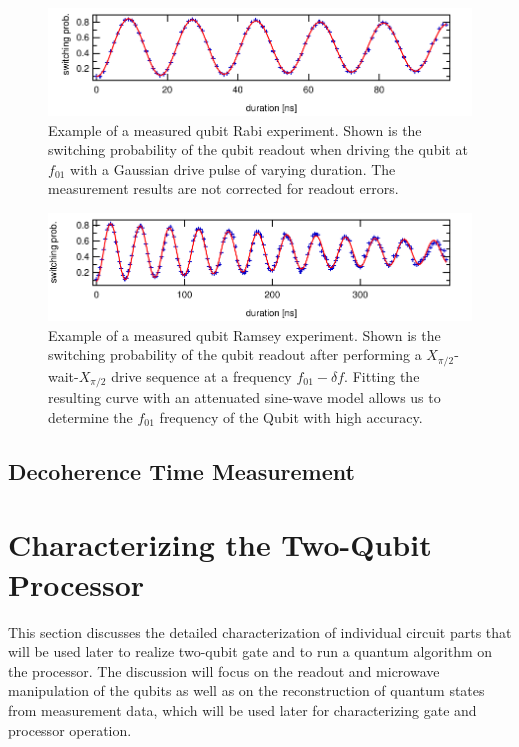 \begin{figure}[ht!]
\centering
\includegraphics[width=1\textwidth]{"./data/ct5/2011_04_21 - grover and tomo/example - qubit 2 rabi"}
\caption[]{Example of a measured qubit Rabi experiment. Shown is the switching probability of the qubit readout when driving the qubit at $f_{01}$ with a Gaussian drive pulse of varying duration. The measurement results are not corrected for readout errors.}
\label{fig:qubit_rabi_example}
\end{figure}


\begin{figure}[ht!]
\centering
\includegraphics[width=1\textwidth]{"./data/ct5/2011_04_21 - grover and tomo/example - qubit 2 ramsey"}
\caption[]{Example of a measured qubit Ramsey experiment. Shown is the switching probability of the qubit readout after performing a $X_{\pi/2}$-wait-$X_{\pi/2}$ drive sequence at a frequency $f_{01}-\delta f$. Fitting the resulting curve with an attenuated sine-wave model allows us to determine the $f_{01}$ frequency of the Qubit with high accuracy.}
\label{fig:qubit_ramsey_example}
\end{figure}

\section{Decoherence Time Measurement}

\chapter{Characterizing the Two-Qubit Processor}

This section discusses the detailed characterization of individual circuit parts that will be used later to realize two-qubit gate and to run a quantum algorithm on the processor. The discussion will focus on the readout and microwave manipulation of the qubits as well as  on the reconstruction of quantum states from measurement data, which will be used later for characterizing gate and processor operation.

